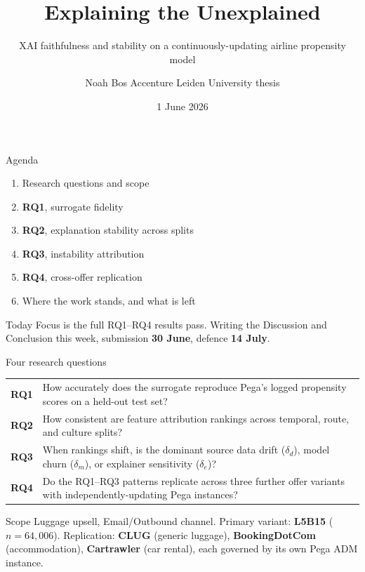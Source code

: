 \documentclass[aspectratio=169,11pt]{beamer}
\title{Explaining the Unexplained}
\subtitle{XAI faithfulness and stability on a continuously-updating airline propensity model}
\author{Noah Bos \textbar{} Accenture \textbar{} Leiden University thesis}
\date{1 June 2026}
\begin{document}
\begin{frame}
  \titlepage
\end{frame}

\begin{frame}{Agenda}
  \vspace{0.3em}
  \begin{enumerate}
    \setlength\itemsep{0.6em}
    \item Research questions and scope
    \item \textbf{RQ1}, surrogate fidelity
    \item \textbf{RQ2}, explanation stability across splits
    \item \textbf{RQ3}, instability attribution
    \item \textbf{RQ4}, cross-offer replication
    \item Where the work stands, and what is left
  \end{enumerate}
  \vspace{0.8em}
  \begin{block}{Today}
    \footnotesize Focus is the full RQ1--RQ4 results pass. Writing the Discussion and Conclusion this week, submission \textbf{30 June}, defence \textbf{14 July}.
  \end{block}
\end{frame}

\begin{frame}{Four research questions}
  \begin{tabularx}{\linewidth}{@{}p{1.4em}X@{}}
    \textcolor{accpurple}{\textbf{RQ1}} & How accurately does the surrogate reproduce Pega's logged propensity scores on a held-out test set? \\[0.5em]
    \textcolor{accpurple}{\textbf{RQ2}} & How consistent are feature attribution rankings across temporal, route, and culture splits? \\[0.5em]
    \textcolor{accpurple}{\textbf{RQ3}} & When rankings shift, is the dominant source data drift ($\delta_d$), model churn ($\delta_m$), or explainer sensitivity ($\delta_e$)? \\[0.5em]
    \textcolor{accpurple}{\textbf{RQ4}} & Do the RQ1--RQ3 patterns replicate across three further offer variants with independently-updating Pega instances? \\
  \end{tabularx}
  \vspace{0.5em}
  \begin{block}{Scope}
    \footnotesize Luggage upsell, Email/Outbound channel. Primary variant: \textbf{L5B15} ($n=64{,}006$). Replication: \textbf{CLUG} (generic luggage), \textbf{BookingDotCom} (accommodation), \textbf{Cartrawler} (car rental), each governed by its own Pega ADM instance.
  \end{block}
\end{frame}
\end{document}
